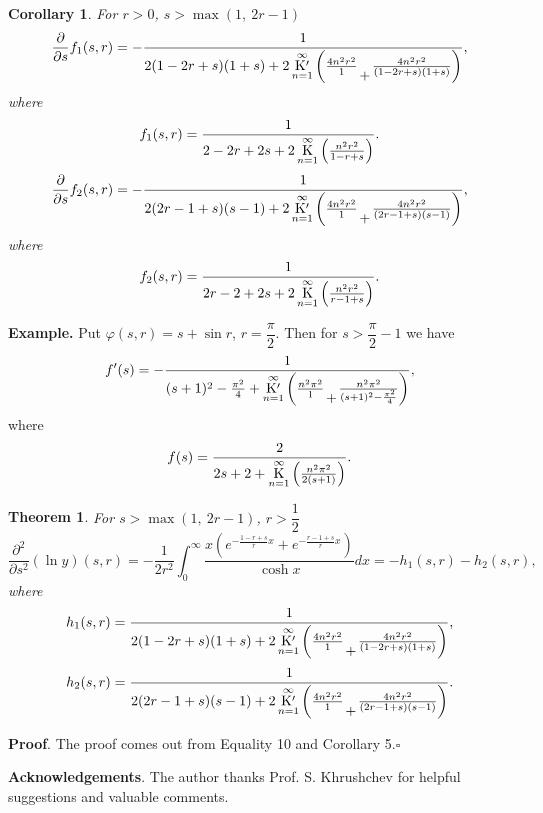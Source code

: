 \documentclass[a4paper,10pt]{article}      %
\newcommand{\K}{\operatornamewithlimits{K}}
\newcommand{\TK}{\operatornamewithlimits{K^{\prime}}}
\newcommand{\low}[1]{\genfrac{}{}{0cm}{0}{}{#1}}
\newtheorem{theorem}{Theorem}[section]
\newtheorem{corollary}{Corollary}[section]
\begin{document}
\begin{corollary} For $r> 0$, $s > \max(1, \ 2r-1)$
$$\frac{\partial}{\partial s}f_1(s,r) = - \dfrac{1}{2(1-2r+s)(1+s) + 2\TK\limits_{n=1}^{\infty}\left(\frac{4n^2r^2}{1} \low{+} \frac{4n^2r^2}{(1-2r+s)(1+s)}\right)}, $$ where $$f_1(s,r) = \dfrac{1}{2-2r+2s + 2\K\limits_{n=1}^\infty \left(\frac{n^2r^2}{1-r+s}\right)}.$$
$$\frac{\partial}{\partial s}f_2(s,r) = - \dfrac{1}{2(2r-1+s)(s-1) + 2\TK\limits_{n=1}^{\infty}\left(\frac{4n^2r^2}{1} \low{+} \frac{4n^2r^2}{(2r-1+s)(s-1)}\right)}, $$ where $$f_2(s,r) = \dfrac{1}{2r-2+2s + 2\K\limits_{n=1}^\infty \left(\frac{n^2r^2}{r-1+s}\right)}.$$
\end{corollary}

{\bf Example.} Put $\varphi(s,r) = s + \sin r$, $r = \dfrac{\pi}{2}$. Then for $s > \dfrac{\pi}{2} - 1$ we have
$$f'(s) = - \dfrac{1}{(s+1)^2 - \frac{\pi^2}{4} + \TK\limits_{n=1}^{\infty}\left(\frac{n^2\pi^2}{1} \low{+} \frac{n^2\pi^2}{(s+1)^2-\frac{\pi^2}{4} }\right)}, $$ where $$f(s) = \dfrac{2}{2s+2 + \K\limits_{n=1}^\infty \left(\frac{n^2\pi^2}{2(s+1)}\right)}.$$

\begin{theorem} For $s> \max(1, \ 2r-1)$, $r> \dfrac{1}{2}$
$$  \dfrac{\partial^2}{\partial s^2}(\ln y)(s,r) =  - \dfrac{1}{2r^2}\int_0^{\infty} \dfrac{x(e^{-\frac{1-r+s}{r}x}+ e^{-\frac{r-1+s}{r}x})}{\cosh x}dx = - h_1(s,r) - h_2(s,r), $$
where
$$h_1(s,r) = \dfrac{1}{2(1-2r+s)(1+s) + 2\TK\limits_{n=1}^{\infty}\left(\frac{4n^2r^2}{1} \low{+} \frac{4n^2r^2}{(1-2r+s)(1+s)}\right)},$$
$$ h_2(s,r) = \dfrac{1}{2(2r-1+s)(s-1) + 2\TK\limits_{n=1}^{\infty}\left(\frac{4n^2r^2}{1} \low{+} \frac{4n^2r^2}{(2r-1+s)(s-1)}\right)}.$$
\end{theorem}

{\bf Proof}.
The proof comes out from Equality 10 and Corollary 5.\hfill $\square$




{\bf Acknowledgements}. The author thanks Prof. S. Khrushchev for helpful suggestions and valuable comments.
\end{document}
